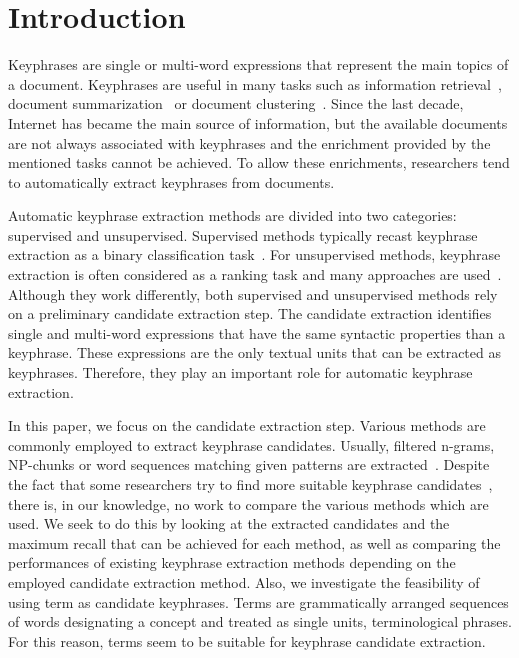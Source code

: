 \section{Introduction}
\label{sec:section}
  Keyphrases are single or multi-word expressions that represent the main topics
  of a document. Keyphrases are useful in many tasks such as information
  retrieval~\cite{medelyan2008smalltrainingset}, document
  summarization~\cite{litvak2008graphbased} or document
  clustering~\cite{han2007webdocumentclustering}. Since the last decade,
  Internet has became the main source of information, but the available
  documents are not always associated with keyphrases and the enrichment
  provided by the mentioned tasks cannot be achieved. To allow these
  enrichments, researchers tend to automatically extract keyphrases from
  documents.

  Automatic keyphrase extraction methods are divided into two categories:
  supervised and unsupervised. Supervised methods typically recast keyphrase
  extraction as a binary classification task~\cite{witten1999kea}. For
  unsupervised methods, keyphrase extraction is often considered as a ranking
  task and many approaches are
  used~\cite{barker2000nounphrasehead,mihalcea2004textrank}. Although they work
  differently, both supervised and unsupervised methods rely on a preliminary
  candidate extraction step. The candidate extraction identifies single and
  multi-word expressions that have the same syntactic properties than a
  keyphrase. These expressions are the only textual units that can be extracted
  as keyphrases. Therefore, they play an important role for automatic keyphrase
  extraction.
  
  In this paper, we focus on the candidate extraction step. Various methods are
  commonly employed to extract keyphrase candidates. Usually, filtered n-grams,
  NP-chunks or word sequences matching given patterns are
  extracted~\cite{hulth2003keywordextraction}. Despite the fact that some
  researchers try to find more suitable keyphrase
  candidates~\cite{hulth2003keywordextraction,kim2009reexaminingautomatickeyphraseextraction},
  there is, in our knowledge, no work to compare the various methods which are
  used. We seek to do this by looking at the extracted candidates and the
  maximum recall that can be achieved for each method, as well as comparing the
  performances of existing keyphrase extraction methods depending on the
  employed candidate extraction method. Also, we investigate the feasibility of
  using term as candidate keyphrases. Terms are grammatically arranged sequences
  of words designating a concept and treated as single units, terminological
  phrases. For this reason, terms seem to be suitable for keyphrase candidate
  extraction.

